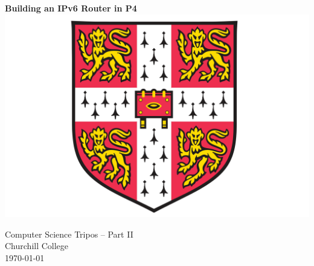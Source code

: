 \documentclass[12pt,a4paper,twoside,openright]{report}
\begin{document}
\renewcommand{\quote}{\list{}{\rightmargin=\leftmargin\topsep=0pt}\item\relax}




\pagestyle{empty}


\vspace*{30mm}
\begin{center}
	\Huge
	\textbf{Building an IPv6 Router in P4} \\[20mm]

	\vspace{-2mm}
	\includegraphics[scale=0.5]{./figures/crest.png}
	\hspace{0mm}\\[20mm]
	\vspace{2mm}


	\LARGE
	Computer Science Tripos -- Part II \\[1mm]
	Churchill College \\[20mm]

	\Large
	\today
\end{center}

\newpage
\thispagestyle{empty}


\pagestyle{plain}
\end{document}
